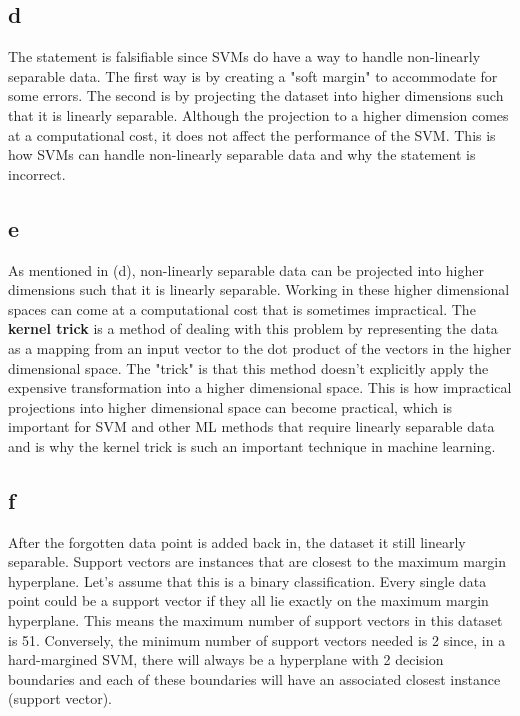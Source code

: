 \documentclass{article}
\begin{document}
\newpage
\subsection*{d}

The statement is falsifiable since SVMs do have a way to handle non-linearly separable data.
The first way is by creating a "soft margin" to accommodate for some errors. The second is by projecting
the dataset into higher dimensions such that it is linearly separable. Although the projection to 
a higher dimension comes at a computational cost, it does not affect the performance of the 
SVM. This is how SVMs can handle non-linearly separable data and why the statement 
is incorrect.

\subsection*{e}

As mentioned in (d), non-linearly separable data can be projected into higher dimensions such that it is 
linearly separable. Working in these higher dimensional spaces can come at a 
computational cost that is sometimes impractical. The \textbf{kernel trick} is a method of dealing
with this problem by representing the data as a mapping from an input vector 
to the dot product of the vectors in the higher dimensional space. The "trick" is that this method doesn't explicitly apply the 
expensive transformation into a higher dimensional space. This is how impractical projections into higher
dimensional space can become practical, which is important for SVM and other ML methods that 
require linearly separable data and is why the kernel trick is such an important technique in machine learning.

\subsection*{f}

After the forgotten data point is added back in, the dataset it still 
linearly separable. Support vectors are instances that are closest to the
maximum margin hyperplane. Let's assume that this is a binary classification. 
Every single data point could be a support vector if they all lie exactly on the 
maximum margin hyperplane. This means the maximum number of support vectors in this 
dataset is 51. Conversely, the minimum number of support vectors needed 
is 2 since, in a hard-margined SVM, there will always be a hyperplane with 2 
decision boundaries and each of these boundaries will have an associated closest
instance (support vector).
\end{document}
